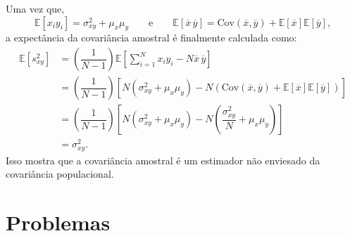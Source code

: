 Uma vez que,
\begin{equation*}
\mathbb{E}[x_i y_i] = \sigma_{xy}^2 + \mu_x \mu_y \qquad \text{e} \qquad \mathbb{E}[\overline{x}\,\overline{y}] = \text{Cov}(\overline{x},\overline{y}) + \mathbb{E}[\overline{x}]\mathbb{E}[\overline{y}],
\end{equation*}
a expectância da covariância amostral é finalmente calculada como:
\begin{align*}
\mathbb{E}[s_{xy}^2] &= \left(\dfrac{1}{N-1}\right)\mathbb{E}\left[\sum_{i=1}^{N} x_i y_i - N\overline{x}\,\overline{y}\right] \\
&= \left(\dfrac{1}{N-1}\right)\left[N(\sigma_{xy}^2 + \mu_x \mu_y) - N\left(\text{Cov}(\overline{x},\overline{y}) + \mathbb{E}[\overline{x}]\mathbb{E}[\overline{y}]\right)\right] \\
&= \left(\dfrac{1}{N-1}\right)\left[N(\sigma_{xy}^2 + \mu_x \mu_y) - N\left(\dfrac{\sigma_{xy}^2}{N} + \mu_x \mu_y\right)\right] \\
&= \sigma_{xy}^2.
\end{align*}
Isso mostra que a covariância amostral é um estimador não enviesado da covariância populacional.

\section{Problemas}

